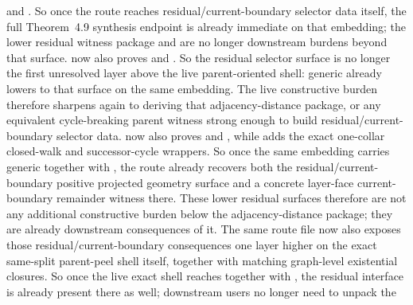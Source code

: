\documentclass[11pt]{article}
\begin{document}
and
.
So once the route reaches residual/current-boundary selector data itself, the
full Theorem~4.9 synthesis endpoint is already immediate on that embedding;
the lower residual witness package and  are
no longer downstream burdens beyond that surface.
 now also proves
and
.
So the residual selector surface is no longer the first unresolved layer above
the live parent-oriented shell: generic
 already lowers to that
surface on the same embedding.  The live constructive burden therefore
sharpens again to deriving that adjacency-distance package, or any equivalent
cycle-breaking parent witness strong enough to build residual/current-boundary
selector data.   now also proves
and
,
while  adds the exact one-collar
closed-walk and successor-cycle wrappers.  So once the same embedding carries
generic  together with
, the route already recovers both the
residual/current-boundary positive projected geometry surface and a concrete
layer-face current-boundary remainder witness there.  These lower residual
surfaces therefore are not any additional constructive burden below the
adjacency-distance package; they are already downstream consequences of it.
The same route file now also exposes those residual/current-boundary
consequences one layer higher on the exact same-split parent-peel shell
itself, together with matching graph-level existential closures.  So once the
live exact shell reaches 
together with , the residual interface is
already present there as well; downstream users no longer need to unpack the
\end{document}
